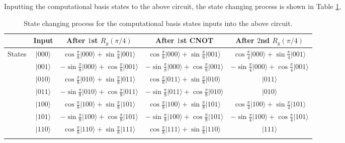 \documentclass[en]{sol-man}
\begin{document}
\begin{pf}
    Inputting the computational basis states to the above circuit, the state changing process is shown in Table \ref{E4.26-State-Changing-Process},
    \begin{table}[h]
        \centering
        \caption{State changing process for the computational basis states inputs into the above circuit.}
        \label{E4.26-State-Changing-Process}
        \begin{tabular}{|c|c|c|c|c|}
            \hline
             & Input & After $1$st $R_y(\pi/4)$ & After $1$st CNOT & After $2$nd $R_y(\pi/4)$ \\ \hline
            \multirow{8}{*}{States} & $\lvert 000\rangle$ & $\cos\frac{\pi}{8}\lvert 000\rangle+\sin\frac{\pi}{8}\lvert 001\rangle$ & $\cos\frac{\pi}{8}\lvert 000\rangle+\sin\frac{\pi}{8}\lvert 001\rangle$ & $\cos\frac{\pi}{4}\lvert 000\rangle+\sin\frac{\pi}{4}\lvert 001\rangle$ \\ \cline{2-5} 
             & $\lvert 001\rangle$ & $-\sin\frac{\pi}{8}\lvert 000\rangle+\cos\frac{\pi}{8}\lvert 001\rangle$ & $-\sin\frac{\pi}{8}\lvert 000\rangle+\cos\frac{\pi}{8}\lvert 001\rangle$ & $-\sin\frac{\pi}{4}\lvert 000\rangle+\cos\frac{\pi}{4}\lvert 001\rangle$ \\ \cline{2-5} 
             & $\lvert 010\rangle$ & $\cos\frac{\pi}{8}\lvert 010\rangle+\sin\frac{\pi}{8}\lvert 011\rangle$ & $\cos\frac{\pi}{8}\lvert 011\rangle+\sin\frac{\pi}{8}\lvert 010\rangle$ & $\lvert 011\rangle$ \\ \cline{2-5} 
             & $\lvert 011\rangle$ & $-\sin\frac{\pi}{8}\lvert 010\rangle+\cos\frac{\pi}{8}\lvert 011\rangle$ & $-\sin\frac{\pi}{8}\lvert 011\rangle+\cos\frac{\pi}{8}\lvert 010\rangle$ & $\lvert 010\rangle$ \\ \cline{2-5} 
             & $\lvert 100\rangle$ & $\cos\frac{\pi}{8}\lvert 100\rangle+\sin\frac{\pi}{8}\lvert 101\rangle$ & $\cos\frac{\pi}{8}\lvert 100\rangle+\sin\frac{\pi}{8}\lvert 101\rangle$ & $\cos\frac{\pi}{4}\lvert 100\rangle+\sin\frac{\pi}{4}\lvert 101\rangle$ \\ \cline{2-5} 
             & $\lvert 101\rangle$ & $-\sin\frac{\pi}{8}\lvert 100\rangle+\cos\frac{\pi}{8}\lvert 101\rangle$ & $-\sin\frac{\pi}{8}\lvert 100\rangle+\cos\frac{\pi}{8}\lvert 101\rangle$ & $-\sin\frac{\pi}{4}\lvert 100\rangle+\cos\frac{\pi}{4}\lvert 101\rangle$ \\ \cline{2-5} 
             & $\lvert 110\rangle$ & $\cos\frac{\pi}{8}\lvert 110\rangle+\sin\frac{\pi}{8}\lvert 111\rangle$ & $\cos\frac{\pi}{8}\lvert 111\rangle+\sin\frac{\pi}{8}\lvert 110\rangle$ & $\lvert 111\rangle$ \\ \cline{2-5} 

\end{tabular}
\end{table}
\end{pf}
\end{document}
